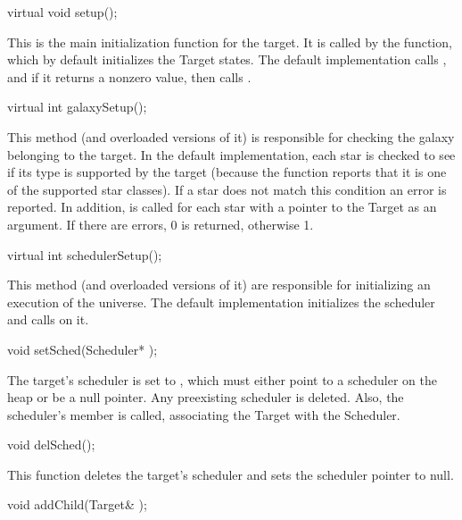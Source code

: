 \begin{example}
virtual void setup();
\end{example}

This is the main initialization function for the target.  It is called
by the  function, which by default initializes the
Target states.  The default implementation calls ,
and if it returns a nonzero value, then calls .

\begin{example}
virtual int galaxySetup();
\end{example}

This method (and overloaded versions of it) is responsible for checking
the galaxy belonging to the target.  In the default implementation,
each star is checked to see if its type is
supported by the target (because the  function reports
that it is one of the supported star classes).  If a star does not
match this condition an error is reported.  In addition,
 is called for each star with a pointer to the Target
as an argument.  If there are errors, 0 is returned, otherwise 1.

\begin{example}
virtual int schedulerSetup();
\end{example}

This method (and overloaded versions of it) are responsible for
initializing an execution of the universe.  The default implementation
initializes the scheduler and calls  on it.

\begin{example}
void setSched(Scheduler* );
\end{example}

The target's scheduler is set to , which must either point to a
scheduler on the heap or be a null pointer.  Any preexisting scheduler
is deleted.  Also, the scheduler's  member is called,
associating the Target with the Scheduler.

\begin{example}
void delSched();
\end{example}

This function deletes the target's scheduler and sets the scheduler
pointer to null.

\begin{example}
void addChild(Target& );
\end{example}

